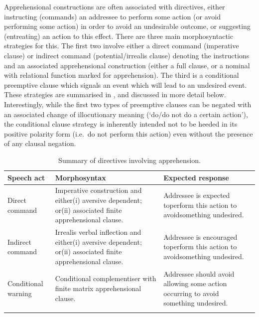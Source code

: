 \documentclass[output=paper,colorlinks,citecolor=brown]{langscibook}
\begin{document}
Apprehensional constructions are often associated with directives, either instructing (commands) an addressee to perform some action (or avoid performing some action) in order to avoid an undesirable outcome, or suggesting (entreating) an action to this effect. There are three main morphosyntactic strategies for this. The first two involve either a direct command (imperative clause) or indirect command (potential/irrealis clause) denoting the instructions and an associated apprehensional construction (either a full clause, or a nominal with relational function marked for apprehension). The third is a conditional preemptive clause which signals an event which will lead to an undesired event. These strategies are summarised in , and discussed in more detail below. Interestingly, while the first two types of preemptive clauses can be negated with an associated change of illocutionary meaning (`do/do not do a certain action'), the conditional clause strategy is inherently intended not to be heeded in its positive polarity form (i.e.\  do not perform this action) even without the presence of any clausal negation.

\begin{table}

\caption{Summary of directives involving apprehension.}
\label{tab10-bro}
\begin{tabularx}{\textwidth}{p{19mm}QQ}
\lsptoprule
{Speech act} & {Morphosyntax} & {Expected response} \\
\midrule
Direct \newline command   & Imperative construction and either\newline (i) aversive dependent; or\newline (ii) associated finite apprehensional clause.   & Addressee is expected to\newline perform this action to avoid\newline something undesired.   \\
\tablevspace
Indirect \newline command   & Irrealis verbal inflection and either\newline (i) aversive dependent; or\newline (ii) associated finite apprehensional clause.   & Addressee is encouraged to\newline perform this action to avoid\newline something undesired.   \\
\tablevspace
Conditional \newline warning   & Conditional complementiser \newline with finite matrix \newline apprehensional clause. & Addressee should avoid \newline allowing some action \newline occurring to avoid something \newline undesired.   \\
\lspbottomrule
\end{tabularx}

\end{table}
\end{document}

